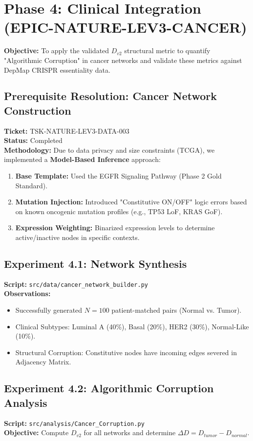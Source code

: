 \documentclass{article}
\begin{document}
\section{Phase 4: Clinical Integration (EPIC-NATURE-LEV3-CANCER)}
\textbf{Objective:} To apply the validated $D_{v2}$ structural metric to quantify "Algorithmic Corruption" in cancer networks and validate these metrics against DepMap CRISPR essentiality data.

\subsection{Prerequisite Resolution: Cancer Network Construction}
\textbf{Ticket:} TSK-NATURE-LEV3-DATA-003 \\
\textbf{Status:} Completed \\
\textbf{Methodology:}
Due to data privacy and size constraints (TCGA), we implemented a \textbf{Model-Based Inference} approach:
\begin{enumerate}
    \item \textbf{Base Template:} Used the EGFR Signaling Pathway (Phase 2 Gold Standard).
    \item \textbf{Mutation Injection:} Introduced "Constitutive ON/OFF" logic errors based on known oncogenic mutation profiles (e.g., TP53 LoF, KRAS GoF).
    \item \textbf{Expression Weighting:} Binarized expression levels to determine active/inactive nodes in specific contexts.
\end{enumerate}

\subsection{Experiment 4.1: Network Synthesis}
\textbf{Script:} \texttt{src/data/cancer\_network\_builder.py} \\
\textbf{Observations:}
\begin{itemize}
    \item Successfully generated $N=100$ patient-matched pairs (Normal vs. Tumor).
    \item Clinical Subtypes: Luminal A (40\%), Basal (20\%), HER2 (30\%), Normal-Like (10\%).
    \item Structural Corruption: Constitutive nodes have incoming edges severed in Adjacency Matrix.
\end{itemize}

\subsection{Experiment 4.2: Algorithmic Corruption Analysis}
\textbf{Script:} \texttt{src/analysis/Cancer\_Corruption.py} \\
\textbf{Objective:} Compute $D_{v2}$ for all networks and determine $\Delta D = D_{tumor} - D_{normal}$.
\end{document}
